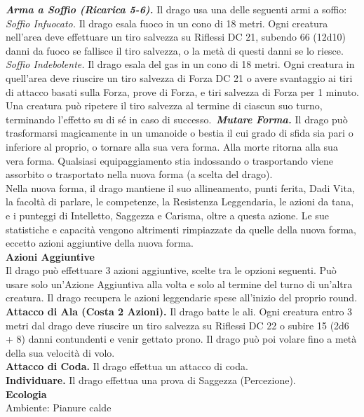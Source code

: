 \begin{multicols}{2}
\emph{\textbf{Arma a Soffio (Ricarica 5-6).}} Il drago usa una delle seguenti armi a soffio:\\
\emph{Soffio Infuocato.} Il drago esala fuoco in un cono di 18 metri. Ogni creatura nell'area deve effettuare un tiro salvezza su Riflessi DC 21, subendo 66 (12d10) danni da fuoco se fallisce il tiro salvezza, o la metà di questi danni se lo riesce.\\
\emph{Soffio Indebolente.} Il drago esala del gas in un cono di 18 metri. Ogni creatura in quell'area deve riuscire un tiro salvezza di Forza DC 21 o avere svantaggio ai tiri di attacco basati sulla Forza, prove di Forza, e tiri salvezza di Forza per 1 minuto. Una creatura può ripetere il tiro salvezza al termine di ciascun suo turno, terminando l'effetto su di sé in caso di successo.\
\emph{\textbf{Mutare Forma.}} Il drago può trasformarsi magicamente in un umanoide o bestia il cui grado di sfida sia pari o inferiore al proprio, o tornare alla sua vera forma. Alla morte ritorna alla sua vera forma. Qualsiasi equipaggiamento stia indossando o trasportando viene assorbito o trasportato nella nuova forma (a scelta del drago).\\
Nella nuova forma, il drago mantiene il suo allineamento, punti ferita, Dadi Vita, la facoltà di parlare, le competenze, la Resistenza Leggendaria, le azioni da tana, e i punteggi di Intelletto, Saggezza e Carisma, oltre a questa azione. Le sue statistiche e capacità  vengono altrimenti rimpiazzate da quelle della nuova forma, eccetto azioni aggiuntive della nuova forma.\\
\textbf{Azioni Aggiuntive}\\
Il drago può effettuare 3 azioni aggiuntive, scelte tra le opzioni seguenti. Può usare solo un'Azione Aggiuntiva alla volta e solo al termine del turno di un'altra creatura. Il drago recupera le azioni leggendarie spese all'inizio del proprio round.\\
\textbf{Attacco di Ala (Costa 2 Azioni).} Il drago batte le ali. Ogni creatura entro 3 metri dal drago deve riuscire un tiro salvezza su Riflessi DC 22 o subire 15 (2d6 + 8) danni contundenti e venir gettato prono. Il drago può poi volare fino a metà della sua velocità di volo.\\
\textbf{Attacco di Coda.} Il drago effettua un attacco di coda.\\
\textbf{Individuare.} Il drago effettua una prova di Saggezza (Percezione).\\
\textbf{Ecologia}\\
Ambiente: Pianure calde\\

\end{multicols}

